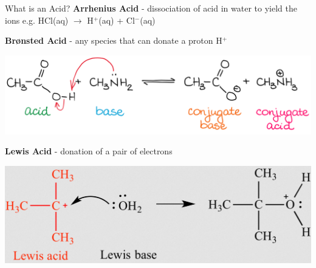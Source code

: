 \documentclass[11pt]{beamer}
\begin{document}
\begin{frame}{What is an Acid?}
  \vspace{0.2in}
  \textbf{Arrhenius Acid} - dissociation of acid in water to yield
  the ions e.g. HCl(aq) $\rightarrow$ H$^+$(aq) + Cl$^-$(aq)
  
  \textbf{Br{\o}nsted Acid} - any species that can donate a proton
  H$^+$

  \begin{center}
    \includegraphics[scale=0.1]{bronsted_acid}
  \end{center}
  \vspace{-0.2in}
  \textbf{Lewis Acid} - donation of a pair of electrons
  \begin{center}
    \includegraphics[scale=0.07]{lewis_acid}
  \end{center}
\end{frame}
\end{document}
